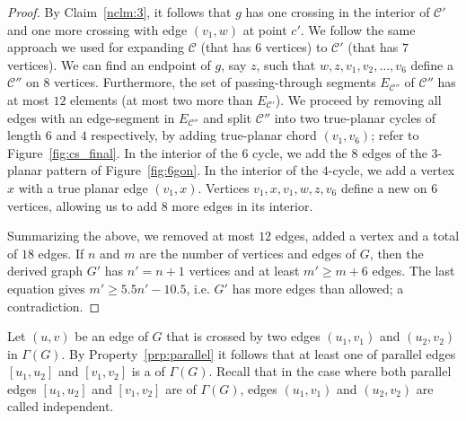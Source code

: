 \begin{proof}
By Claim~\ref{nclm:3}, it follows that $g$ has one crossing in the interior of  $\mathcal{C}'$ and one more crossing with edge $(v_1,w)$ at point $c'$. We follow the same approach we used for expanding $\mathcal{C}$ (that has $6$ vertices) to $\mathcal{C}'$ (that has $7$ vertices). We can find an endpoint of $g$, say $z$, such that $w,z,v_1,v_2,\dots,v_6$ define a \pp $\mathcal{C}''$ on $8$ vertices. Furthermore, the set of passing-through segments $E_{\mathcal{C}''}$ of $\mathcal{C}''$ has at most $12$ elements (at most two more than $E_{\mathcal{C}'}$). We proceed by removing all edges with an edge-segment in $E_{\mathcal{C}''}$ and split $\mathcal{C}''$ into two true-planar cycles of length $6$ and $4$ respectively, by adding  true-planar chord $(v_1,v_6)$; refer to Figure~\ref{fig:cs_final}. In the interior of the $6$ cycle, we add the $8$ edges of the $3$-planar pattern of Figure~\ref{fig:6gon}. In the interior of the $4$-cycle, we add a vertex $x$ with a true planar edge $(v_1,x)$. Vertices $v_1,x,v_1,w,z,v_6$ define a new \pp on $6$ vertices, allowing us to add $8$ more edges in its interior. 

Summarizing the above, we removed at most $12$ edges, added a vertex and a total of $18$ edges. If $n$ and $m$ are the number of vertices and edges of $G$, then the derived graph $G'$ has $n'=n+1$ vertices and at least $m'\geq m+6$ edges. The last equation gives $m'\geq 5.5n'-10.5$, i.e. $G'$ has more edges than allowed; a contradiction.
\end{proof}

Let $(u,v)$ be an edge of $G$ that is crossed by two edges $(u_1,v_1)$ and $(u_2,v_2)$ in $\Gamma(G)$. By Property~\ref{prp:parallel} it follows that at least one of parallel edges $[u_1,u_2]$ and $[v_1,v_2]$ is a \pe of $\Gamma(G)$. Recall that in the case where both parallel edges $[u_1,u_2]$ and $[v_1,v_2]$ are \pes of $\Gamma(G)$, edges $(u_1,v_1)$ and $(u_2,v_2)$ are called independent.

